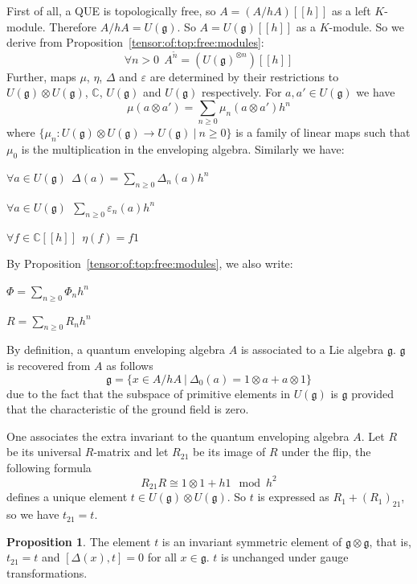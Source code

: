 \documentclass[8pt]{article}
\theoremstyle{definition}
\theoremstyle{definition}
\theoremstyle{definition}
\theoremstyle{definition}
\theoremstyle{definition}
\theoremstyle{definition}
\theoremstyle{definition}
\newtheorem{prop}{Proposition}[section]
\theoremstyle{definition}
\theoremstyle{definition}
\theoremstyle{definition}
\theoremstyle{definition}
\theoremstyle{definition}
\theoremstyle{definition}
\theoremstyle{definition}
\theoremstyle{question}
\begin{document}
First of all, a QUE is topologically free, so $A = (A/hA)[[h]]$ as a left $K$-module. Therefore $A/hA = U(\mathfrak{g})$.
So $A = U(\mathfrak{g})[[h]]$ as a $K$-module. So we derive from Proposition~\ref{tensor:of:top:free:modules}:
\[
\forall n > 0 \:\: A^{\widetilde n} = (U(\mathfrak{g})^{\otimes n})[[h]]
\]
Further, maps $\mu$, $\eta$, $\Delta$ and $\varepsilon$ are determined by their restrictions to 
$U(\mathfrak{g}) \otimes U(\mathfrak{g})$, $\mathbb{C}$, $U(\mathfrak{g})$ and $U(\mathfrak{g})$ respectively. For $a, a' \in U(\mathfrak{g})$
we have 
\[
\mu(a \otimes a') = \sum \limits_{n \geq 0} \mu_n (a \otimes a') h^n
\]
where $\{ \mu_n : U(\mathfrak{g}) \otimes U(\mathfrak{g}) \to U(\mathfrak{g}) \: | \: n \geq 0 \} $ is a family of linear maps
such that $\mu_0$ is the multiplication in the enveloping algebra. Similarly we have:
\begin{center}
  $\forall a \in U(\mathfrak{g})\:\: \Delta(a) = \sum \limits_{n \geq 0} \Delta_n (a) h^n$

  $\forall a \in U(\mathfrak{g})\:\: \sum \limits_{n \geq 0} \varepsilon_n (a) h^n$

  $\forall f \in \mathbb{C}[[h]] \:\: \eta(f) = f1$
\end{center}
By Proposition~\ref{tensor:of:top:free:modules}, we also write:
\begin{center}
  $\Phi = \sum \limits_{n \geq 0} \Phi_n h^n$ 

  $R = \sum \limits_{n \geq 0} R_n h^n$ 
\end{center}

By definition, a quantum enveloping algebra $A$ is associated to a Lie algebra $\mathfrak{g}$. $\mathfrak{g}$
is recovered from $A$ as follows
\[
\mathfrak{g} = \{ x \in A/hA \: | \: \Delta_0(a) = 1 \otimes a + a \otimes 1 \}
\]
due to the fact that the subspace of primitive elements in $U(\mathfrak{g})$
is $\mathfrak{g}$ provided that the characteristic of the ground field is zero.

One associates the extra invariant to the quantum enveloping algebra $A$. Let $R$ be its universal $R$-matrix
and let $R_{21}$ be its image of $R$ under the flip, the following formula
\[
R_{21} R \cong 1 \otimes 1 + h1 \mod h^2
\]
defines a unique element $t \in U(\mathfrak{g}) \otimes U(\mathfrak{g})$. So $t$ is expressed as 
$R_1 + (R_1)_{21}$, so we have $t_{21} = t$.

\begin{prop}
  The element $t$ is an invariant symmetric element of $\mathfrak{g} \otimes \mathfrak{g}$,
  that is, $t_{21} = t$ and $[\Delta(x), t] = 0$ for all $x \in \mathfrak{g}$. $t$ is unchanged under gauge 
  transformations.
\end{prop}
\end{document}
